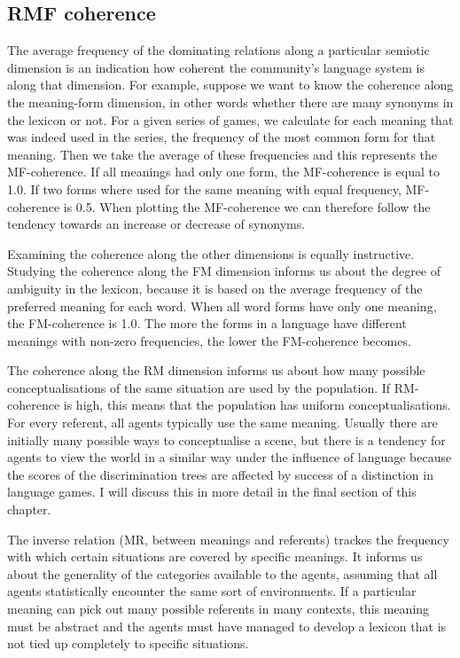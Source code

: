 \subsection{RMF coherence}

The average frequency of the dominating relations along
a particular semiotic dimension is an indication how coherent the
community's language system is along that dimension.
For example, suppose we want to know the coherence along
the meaning-form dimension, in other words
whether there are many synonyms in the lexicon or not.
For a given series of games, we calculate for each meaning
that was indeed used in the series,
the frequency of the most common form
for that meaning. Then we take the average of these frequencies
and this represents the MF-coherence. If all meanings had
only one form, the MF-coherence is equal to 1.0. If two forms
where used for the same meaning with equal frequency, 
MF-coherence is 0.5. When plotting the
MF-coherence we can therefore follow the tendency towards
an increase or decrease of synonyms.

Examining the coherence along the other dimensions is 
equally instructive. Studying the coherence along the FM 
dimension informs us about the degree of ambiguity in the lexicon, 
because it is based on the average frequency of
the preferred meaning for each word. 
When all word forms have only one meaning, the FM-coherence is 
1.0. The more the forms in a language have different 
meanings with non-zero frequencies, the lower the FM-coherence
becomes. 

The coherence along the RM dimension informs us 
about how many possible conceptualisations of the same
situation are used by the population. If RM-coherence is 
high, this means that the population has 
uniform conceptualisations. For every referent, 
all agents typically use the same meaning. 
Usually there are initially many possible ways to conceptualise 
a scene, but there is a tendency 
for agents to view the world in a similar way under
the influence of language because the scores of the 
discrimination trees are affected by success of a 
distinction in language games. I will discuss this 
in more detail in the final section of this chapter.

The inverse relation (MR, between meanings and referents)
trackes the frequency with 
which certain situations are covered by specific
meanings. It informs us about 
the generality of the categories available to the 
agents, assuming that all agents statistically encounter
the same sort of environments. If a particular meaning can
pick out many possible referents in many contexts, this
meaning must be abstract and the agents must have managed
to develop a lexicon that is not tied up completely 
to specific situations. 

